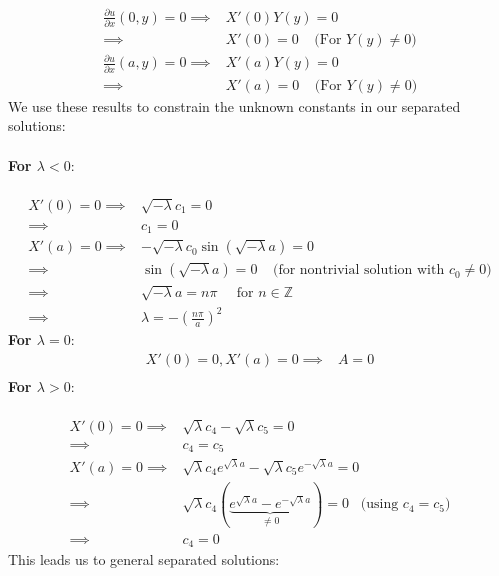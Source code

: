 \documentclass[12pt]{article}
\begin{document}
{\begin{align*}
\frac{\partial u}{\partial x}(0,y) = 0 \implies& X'(0)Y(y) = 0 \\
\implies& X'(0) = 0 \;\;\;\; \text{(For $Y(y) \neq 0$)}
\end{align*}
\begin{align*}
\frac{\partial u}{\partial x}(a,y) = 0 \implies& X'(a)Y(y) = 0 \\
\implies& X'(a) = 0 \;\;\;\; \text{(For $Y(y) \neq 0$)}
\end{align*}
We use these results to constrain the unknown constants in our separated solutions: \\ \\
\textbf{For $\lambda < 0$}: \\ \\
\begin{align*}
X'(0) = 0 \implies& \sqrt{-\lambda} c_1 = 0 \\
\implies& \boxed{c_1 = 0} \\
X'(a) = 0 \implies& -\sqrt{-\lambda} c_0 \sin \left( \sqrt{-\lambda} a \right) = 0 \\
\implies& \sin \left( \sqrt{-\lambda} a \right) = 0 \;\;\;\; \text{(for nontrivial solution with $c_0 \neq 0$)} \\
\implies& \sqrt{-\lambda} a = n\pi \;\;\;\;\; \text{for $n \in \mathbb{Z}$} \\
\implies& \boxed{\lambda = - \left( \frac{n \pi}{a} \right) ^2}
\end{align*}
\textbf{For $\lambda = 0$}: \\
\begin{align*}
X'(0) = 0, X'(a) = 0 \implies& \boxed{A = 0}\\
\end{align*}
\textbf{For $\lambda > 0$}: \\ \\
\begin{align*}
X'(0) = 0 \implies& \sqrt{\lambda} c_4 - \sqrt{\lambda} c_5 = 0 \\
\implies& \boxed{c_4 = c_5} \\
X'(a) = 0 \implies& \sqrt{\lambda} c_4 e^{\sqrt{\lambda} a} - \sqrt{\lambda} c_5 e^{-\sqrt{\lambda} a} = 0 \\
\implies& \sqrt{\lambda} c_4 \left( \underbrace{ e^{\sqrt{\lambda} a} - e^{-\sqrt{\lambda} a} }_{\neq 0} \right) = 0 \;\;\; \text{(using $c_4 = c_5$)} \\
\implies& \boxed{c_4 = 0}
\end{align*}
This leads us to general separated solutions: \\ \\
}
\end{document}
